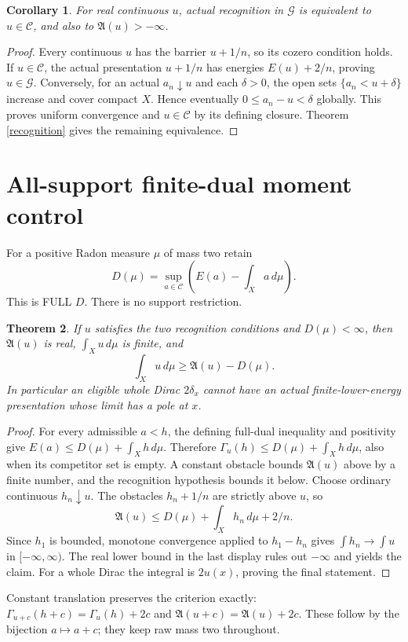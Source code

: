\documentclass[11pt]{article}
\newtheorem{theorem}{Theorem}
\newtheorem{corollary}[theorem]{Corollary}
\newcommand{\C}{\mathcal C}
\newcommand{\G}{\mathcal G}
\newcommand{\A}{\mathfrak A}
\begin{document}
\begin{corollary}\label{continuous}
For real continuous $u$, actual recognition in $\G$ is equivalent to
$u\in\C$, and also to $\A(u)>-\infty$.
\end{corollary}
\begin{proof}
Every continuous $u$ has the barrier $u+1/n$, so its cozero condition
holds. If $u\in\C$, the actual presentation $u+1/n$ has energies
$E(u)+2/n$, proving $u\in\G$. Conversely, for an actual $a_n\downarrow u$
and each $\delta>0$, the open sets $\{a_n<u+\delta\}$ increase and
cover compact $X$. Hence eventually $0\le a_n-u<\delta$ globally.
This proves uniform convergence and $u\in\C$ by its defining closure.
Theorem \ref{recognition} gives the remaining equivalence.
\end{proof}

\section*{All-support finite-dual moment control}
For a positive Radon measure $\mu$ of mass two retain
\[
 D(\mu)=\sup_{a\in\C}\left(E(a)-\int_Xa\,d\mu\right).
\]
This is FULL $D$. There is no support restriction.

\begin{theorem}\label{moment}
If $u$ satisfies the two recognition conditions and $D(\mu)<\infty$,
then $\A(u)$ is real, $\int_Xu\,d\mu$ is finite, and
\[
                   \int_Xu\,d\mu\ge\A(u)-D(\mu).
\]
In particular an eligible whole Dirac $2\delta_x$ cannot have an actual
finite-lower-energy presentation whose limit has a pole at $x$.
\end{theorem}
\begin{proof}
For every admissible $a<h$, the defining full-dual inequality and
positivity give $E(a)\le D(\mu)+\int_Xh\,d\mu$. Therefore
$\Gamma_u(h)\le D(\mu)+\int_Xh\,d\mu$, also when its competitor
set is empty. A constant obstacle bounds $\A(u)$ above by a finite
number, and the recognition hypothesis bounds it below.
Choose ordinary continuous $h_n\downarrow u$. The obstacles
$h_n+1/n$ are strictly above $u$, so
\[
 \A(u)\le D(\mu)+\int_Xh_n\,d\mu+2/n.
\]
Since $h_1$ is bounded, monotone convergence applied to $h_1-h_n$
gives $\int h_n\to\int u$ in $[-\infty,\infty)$. The real lower
bound in the last display rules out $-\infty$ and yields the claim.
For a whole Dirac the integral is $2u(x)$, proving the final statement.
\end{proof}

Constant translation preserves the criterion exactly:
$\Gamma_{u+c}(h+c)=\Gamma_u(h)+2c$ and
$\A(u+c)=\A(u)+2c$. These follow by the bijection $a\mapsto a+c$;
they keep raw mass two throughout.
\end{document}

